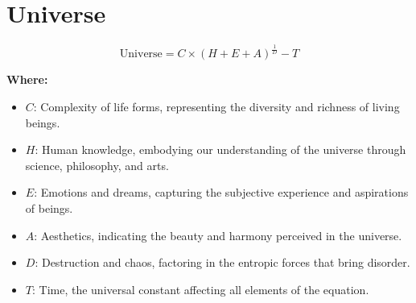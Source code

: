 \chapter{Universe}

\begin{equation}
\text{Universe} = C \times (H + E + A)^\frac{1}{D} - T
\end{equation}

\textbf{Where:}

\begin{itemize}
    \item $C$: Complexity of life forms, representing the diversity and richness of living beings.
    \item $H$: Human knowledge, embodying our understanding of the universe through science, philosophy, and arts.
    \item $E$: Emotions and dreams, capturing the subjective experience and aspirations of beings.
    \item $A$: Aesthetics, indicating the beauty and harmony perceived in the universe.
    \item $D$: Destruction and chaos, factoring in the entropic forces that bring disorder.
    \item $T$: Time, the universal constant affecting all elements of the equation.
\end{itemize}